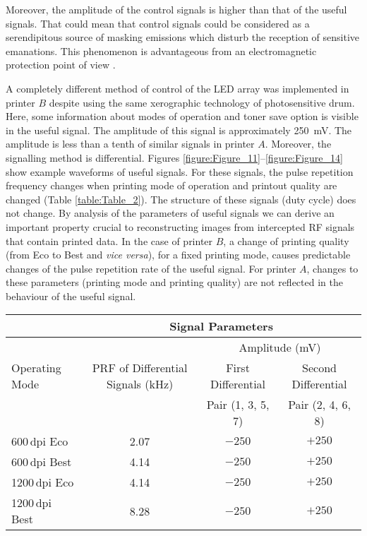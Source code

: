 \documentclass[letterpaper,journal]{ieeetran}
\begin{document}
Moreover, the amplitude of the control signals is higher than that of the
useful signals. That could mean that control signals could be considered as a
serendipitous source of masking emissions which disturb the reception of
sensitive emanations. This phenomenon is advantageous from an electromagnetic
protection point of view \cite{Ulas2016a,Guerrieri2018a,Loughry2002a}.

A completely different method of control of the LED array was implemented in
printer $B$ despite using the same xerographic technology of photosensitive
drum. Here, some information about modes of operation and toner save option is
visible in the useful signal. The amplitude of this signal is approximately
\SI{250}{\milli\volt}. The amplitude is less than a tenth of similar signals
in printer $A$. Moreover, the signalling method is differential.
Figures \ref{figure:Figure_11}--\ref{figure:Figure_14} show example waveforms
of useful signals. For these signals, the pulse repetition frequency changes
when printing mode of operation and printout quality are changed (Table
\ref{table:Table_2}). The structure of these signals (duty cycle) does not
change. By analysis of the parameters of useful signals we can derive an
important property crucial to reconstructing images from intercepted RF
signals that contain printed data. In the case of printer $B$, a change of
printing quality (from Eco to Best and {\it vice versa}), for a fixed
printing mode, causes predictable changes of the pulse repetition rate of the
useful signal. For printer $A$, changes to these parameters (printing mode
and printing quality) are not reflected in the behaviour of the useful
signal.


\begin{table*}[t]
    \caption{Parameters of useful signals from printer $B$ in relation to
        printing parameters.}
    \label{table:Table_2}
    \centering
    \begin{tabular}{|l|c|c|c|}
        \hline
        & \multicolumn{3}{c|}{Signal Parameters} \\
        \hline
        & & \multicolumn{2}{c|}{Amplitude (\si{\milli\volt})} \\
        \hline
        Operating Mode & PRF of Differential Signals (\si{\kilo\hertz})
            & First Differential & Second Differential \\
          & & Pair (1, 3, 5, 7)  & Pair (2, 4, 6, 8) \\
        \hline
        600\,dpi Eco   & 2.07 & $-250$ & $+250$ \\
        600\,dpi Best  & 4.14 & $-250$ & $+250$ \\
        1200\,dpi Eco  & 4.14 & $-250$ & $+250$ \\
        1200\,dpi Best & 8.28 & $-250$ & $+250$ \\
        \hline
    \end{tabular}
\end{table*}
\end{document}
